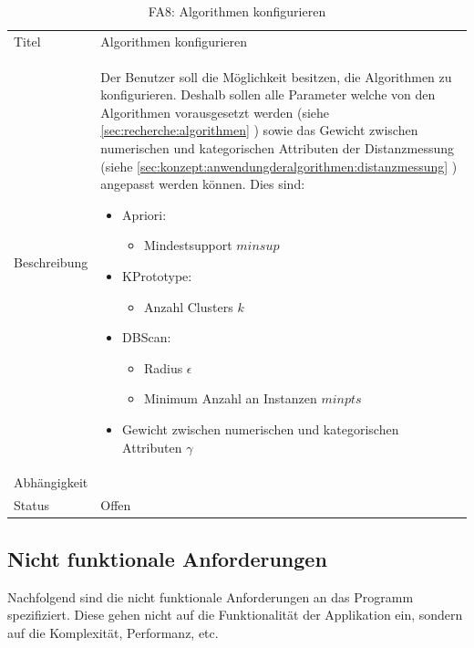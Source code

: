 \begin{table}[H] 
	\caption{FA8: Algorithmen konfigurieren}
	\centering
	\label{fig:anforderungsanalyse:nichtfunktionaleanforderung:fa8}
	\begin{tabular}{ | l | L{10cm} | } 
		\hline 
		 \\ \hline 
		Titel & Algorithmen konfigurieren \\ \hline 
		Beschreibung & Der Benutzer soll die Möglichkeit besitzen, die Algorithmen zu konfigurieren. Deshalb sollen alle Parameter welche von den Algorithmen vorausgesetzt werden (siehe \cref{sec:recherche:algorithmen} ) sowie das Gewicht zwischen numerischen und kategorischen Attributen der Distanzmessung (siehe \cref{sec:konzept:anwendungderalgorithmen:distanzmessung} ) angepasst werden können.
		Dies sind: 
		\begin{itemize}
			\item Apriori:
			\begin{itemize}
				\item Mindestsupport $minsup$
			\end{itemize}
			\item KPrototype:
			\begin{itemize}
				\item Anzahl Clusters $k$
			\end{itemize}
			\item DBScan:
			\begin{itemize}
				\item Radius $\epsilon$
				\item Minimum Anzahl an Instanzen $minpts$
			\end{itemize}
			\item Gewicht zwischen numerischen und kategorischen Attributen $\gamma$
		\end{itemize}
		 \\ \hline 
		Abhängigkeit & \\ \hline 
		Status & Offen \\ \hline 
	\end{tabular}
\end{table}


\subsection{Nicht funktionale Anforderungen}
\label{sec:anforderungsanalyse:nichtfunktionaleanforderung}
Nachfolgend sind die nicht funktionale Anforderungen an das Programm spezifiziert. Diese gehen nicht auf die Funktionalität der Applikation ein, sondern auf die Komplexität, Performanz, etc.

